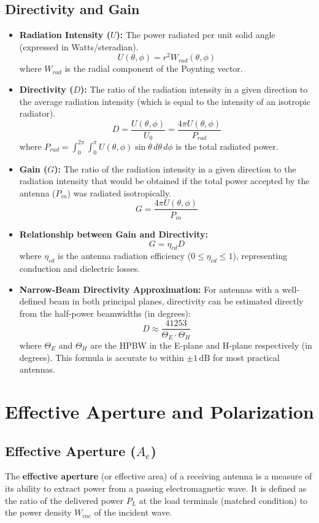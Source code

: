 \documentclass[12pt,a4paper]{article}
\begin{document}
\subsection{Directivity and Gain}
\begin{itemize}[leftmargin=*, itemsep=3pt]
  \item \textbf{Radiation Intensity ($U$):} The power radiated per unit solid angle (expressed in Watts/steradian).
  \[
  U(\theta, \phi) = r^2 W_{rad}(\theta, \phi)
  \]
  where $W_{rad}$ is the radial component of the Poynting vector.
  \item \textbf{Directivity ($D$):} The ratio of the radiation intensity in a given direction to the average radiation intensity (which is equal to the intensity of an isotropic radiator).
  \[
  D = \frac{U(\theta, \phi)}{U_0} = \frac{4\pi U(\theta, \phi)}{P_{rad}}
  \]
  where $P_{rad} = \int_{0}^{2\pi}\int_{0}^{\pi} U(\theta, \phi) \sin\theta \, d\theta \, d\phi$ is the total radiated power.
  \item \textbf{Gain ($G$):} The ratio of the radiation intensity in a given direction to the radiation intensity that would be obtained if the total power accepted by the antenna ($P_{in}$) was radiated isotropically.
  \[
  G = \frac{4\pi U(\theta, \phi)}{P_{in}}
  \]
  \item \textbf{Relationship between Gain and Directivity:}
  \[
  G = \eta_{cd} D
  \]
  where $\eta_{cd}$ is the antenna radiation efficiency ($0 \le \eta_{cd} \le 1$), representing conduction and dielectric losses.
  \item \textbf{Narrow-Beam Directivity Approximation:} For antennas with a well-defined beam in both principal planes, directivity can be estimated directly from the half-power beamwidths (in degrees):
  \[
  D \approx \frac{41253}{\Theta_{E} \cdot \Theta_{H}}
  \]
  where $\Theta_E$ and $\Theta_H$ are the HPBW in the E-plane and H-plane respectively (in degrees). This formula is accurate to within $\pm 1\,\text{dB}$ for most practical antennas.\end{itemize}

\section{Effective Aperture and Polarization}

\subsection{Effective Aperture (\texorpdfstring{$A_e$}{Ae})}
The \textbf{effective aperture} (or effective area) of a receiving antenna is a measure of its ability to extract power from a passing electromagnetic wave. It is defined as the ratio of the delivered power $P_L$ at the load terminals (matched condition) to the power density $W_{inc}$ of the incident wave.
\end{document}
